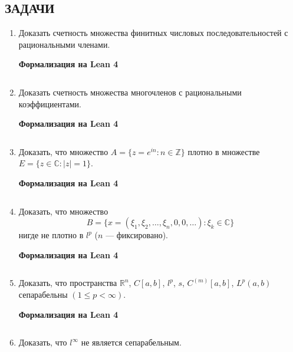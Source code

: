 \documentclass[12pt,a4paper]{article}
\begin{document}
\subsection*{ЗАДАЧИ}
\begin{enumerate}
\newpage
\item Доказать счетность множества финитных числовых последовательностей с рациональными членами.


\begin{center}\small\textbf{Формализация на Lean 4}\end{center}
\inputminted{lean}{FunAn/Section09_Separable/Task01.lean}

\newpage
\item Доказать счетность множества многочленов с рациональными коэффициентами.


\begin{center}\small\textbf{Формализация на Lean 4}\end{center}
\inputminted{lean}{FunAn/Section09_Separable/Task02.lean}

\newpage
\item Доказать, что множество $A=\{z=e^{in} : n\in\mathbb{Z}\}$ плотно в множестве $E=\{z\in\mathbb{C} : |z|=1\}$.


\begin{center}\small\textbf{Формализация на Lean 4}\end{center}
\inputminted{lean}{FunAn/Section09_Separable/Task03.lean}

\newpage
\item Доказать, что множество
$$B=\{x=(\xi_{1},\xi_{2},\dots,\xi_{n},0,0,\dots) : \xi_{k}\in\mathbb{C}\}$$
нигде не плотно в $l^{p}$ ($n$ — фиксировано).


\begin{center}\small\textbf{Формализация на Lean 4}\end{center}
\inputminted{lean}{FunAn/Section09_Separable/Task04.lean}

\newpage
\item Доказать, что пространства $\mathbb{R}^{n}$, $C[a,b]$, $l^{p}$, $s$, $C^{(m)}[a,b]$, $L^{p}(a,b)$ сепарабельны $(1\le p<\infty)$.


\begin{center}\small\textbf{Формализация на Lean 4}\end{center}
\inputminted{lean}{FunAn/Section09_Separable/Task05.lean}

\newpage
\item Доказать, что $l^{\infty}$ не является сепарабельным.



\end{enumerate}
\end{document}

